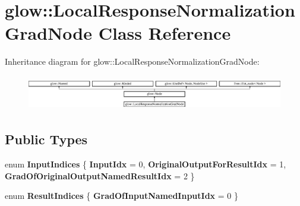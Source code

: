 \hypertarget{classglow_1_1_local_response_normalization_grad_node}{}\section{glow\+:\+:Local\+Response\+Normalization\+Grad\+Node Class Reference}
\label{classglow_1_1_local_response_normalization_grad_node}
Inheritance diagram for glow\+:\+:Local\+Response\+Normalization\+Grad\+Node\+:\begin{figure}[H]
\begin{center}
\leavevmode
\includegraphics[height=1.544118cm]{classglow_1_1_local_response_normalization_grad_node}
\end{center}
\end{figure}
\subsection*{Public Types}
\begin{DoxyCompactItemize}
\item 
\mbox{\label{classglow_1_1_local_response_normalization_grad_node_aff52f27953e17e48923b1864f5f9685f}} 
enum {\bfseries Input\+Indices} \{ {\bfseries Input\+Idx} = 0, 
{\bfseries Original\+Output\+For\+Result\+Idx} = 1, 
{\bfseries Grad\+Of\+Original\+Output\+Named\+Result\+Idx} = 2
 \}
\item 
\mbox{\label{classglow_1_1_local_response_normalization_grad_node_a4b1848901d0774edae5542d18ff63c44}} 
enum {\bfseries Result\+Indices} \{ {\bfseries Grad\+Of\+Input\+Named\+Input\+Idx} = 0
 \}
\end{DoxyCompactItemize}
